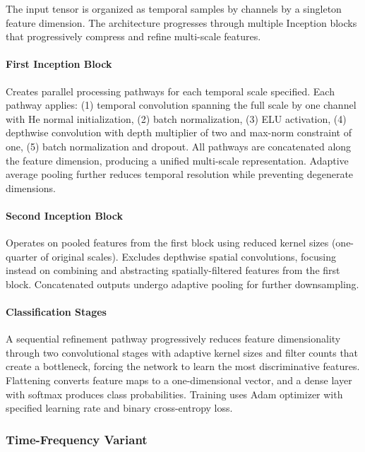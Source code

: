 \documentclass[12pt]{report}
\begin{document}
The input tensor is organized as temporal samples by channels by a singleton feature dimension. The architecture progresses through multiple Inception blocks that progressively compress and refine multi-scale features.

\paragraph{First Inception Block}\mbox{}

Creates parallel processing pathways for each temporal scale specified. Each pathway applies: (1) temporal convolution spanning the full scale by one channel with He normal initialization, (2) batch normalization, (3) ELU activation, (4) depthwise convolution with depth multiplier of two and max-norm constraint of one, (5) batch normalization and dropout. All pathways are concatenated along the feature dimension, producing a unified multi-scale representation. Adaptive average pooling further reduces temporal resolution while preventing degenerate dimensions.

\paragraph{Second Inception Block}\mbox{}

Operates on pooled features from the first block using reduced kernel sizes (one-quarter of original scales). Excludes depthwise spatial convolutions, focusing instead on combining and abstracting spatially-filtered features from the first block. Concatenated outputs undergo adaptive pooling for further downsampling.

\paragraph{Classification Stages}\mbox{}

A sequential refinement pathway progressively reduces feature dimensionality through two convolutional stages with adaptive kernel sizes and filter counts that create a bottleneck, forcing the network to learn the most discriminative features. Flattening converts feature maps to a one-dimensional vector, and a dense layer with softmax produces class probabilities. Training uses Adam optimizer with specified learning rate and binary cross-entropy loss.

\subsubsection{Time-Frequency Variant}
\end{document}
